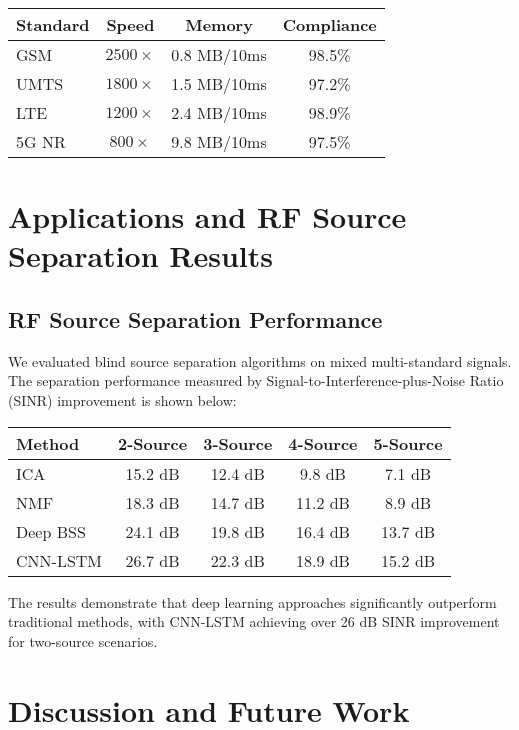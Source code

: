 \documentclass[twocolumn,10pt]{article}
\begin{document}
\begin{center}
\begin{tabular}{|l|c|c|c|}
\hline
\textbf{Standard} & \textbf{Speed} & \textbf{Memory} & \textbf{Compliance} \\
\hline
GSM & $2500\times$ & 0.8 MB/10ms & 98.5\% \\
UMTS & $1800\times$ & 1.5 MB/10ms & 97.2\% \\
LTE & $1200\times$ & 2.4 MB/10ms & 98.9\% \\
5G NR & $800\times$ & 9.8 MB/10ms & 97.5\% \\
\hline
\end{tabular}
\end{center}

\section{Applications and RF Source Separation Results}

\subsection{RF Source Separation Performance}

We evaluated blind source separation algorithms on mixed multi-standard signals. The separation performance measured by Signal-to-Interference-plus-Noise Ratio (SINR) improvement is shown below:

\begin{center}
\begin{tabular}{|l|c|c|c|c|}
\hline
\textbf{Method} & \textbf{2-Source} & \textbf{3-Source} & \textbf{4-Source} & \textbf{5-Source} \\
\hline
ICA & 15.2 dB & 12.4 dB & 9.8 dB & 7.1 dB \\
NMF & 18.3 dB & 14.7 dB & 11.2 dB & 8.9 dB \\
Deep BSS & 24.1 dB & 19.8 dB & 16.4 dB & 13.7 dB \\
CNN-LSTM & 26.7 dB & 22.3 dB & 18.9 dB & 15.2 dB \\
\hline
\end{tabular}
\end{center}

The results demonstrate that deep learning approaches significantly outperform traditional methods, with CNN-LSTM achieving over 26 dB SINR improvement for two-source scenarios.

\section{Discussion and Future Work}
\end{document}
